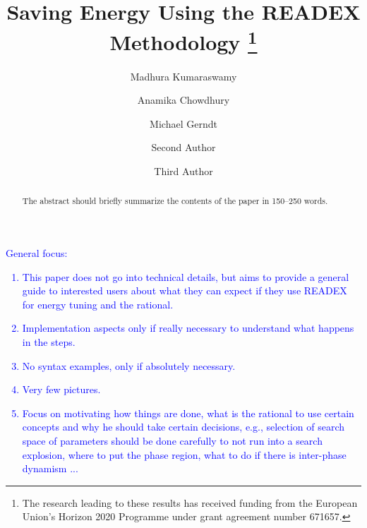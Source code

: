 \documentclass[runningheads]{llncs}
\begin{document}
%
\title{Saving Energy Using the READEX Methodology \thanks{The research leading to these results has received funding from the European Union's Horizon 2020 Programme under grant agreement number 671657.}}
%
%
\author{Madhura Kumaraswamy \and Anamika Chowdhury \and Michael Gerndt  \and
Second Author \and
Third Author}
%
%

\maketitle              %

\begin{abstract}
The abstract should briefly summarize the contents of the paper in
150--250 words.

\end{abstract}

\textcolor{blue}{General focus:
\begin{enumerate}
  \item This paper does not go into technical details, but aims to provide a general guide to interested users about what they can expect if they use READEX for energy tuning and the rational.
  \item Implementation aspects only if really necessary to understand what happens in the steps.
  \item No syntax examples, only if absolutely necessary.
  \item Very few pictures.
  \item Focus on motivating how things are done, what is the rational to use certain concepts and why he should take certain decisions, e.g., selection of search space of parameters should be done carefully to not run into a search explosion, where to put the phase region, what to do if there is inter-phase dynamism ...
\end{enumerate}
}
\end{document}
